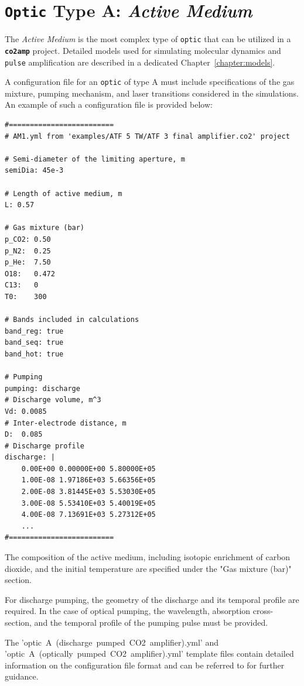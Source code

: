 \documentclass{report}
\begin{document}
\section{\texttt{Optic} Type A: \textit{Active Medium}}
The \textit{Active Medium} is the most complex type of \texttt{optic} that can be utilized in a \textbf{\texttt{co2amp}} project. Detailed models used for simulating molecular dynamics and \texttt{pulse} amplification are described in a dedicated Chapter~\ref{chapter:models}.

A configuration file for an \texttt{optic} of type A must include specifications of the gas mixture, pumping mechanism, and laser transitions considered in the simulations. An example of such a configuration file is provided below:

\begin{verbatim}
#=========================
# AM1.yml from 'examples/ATF 5 TW/ATF 3 final amplifier.co2' project

# Semi-diameter of the limiting aperture, m
semiDia: 45e-3

# Length of active medium, m
L: 0.57

# Gas mixture (bar)
p_CO2: 0.50
p_N2:  0.25
p_He:  7.50
O18:   0.472
C13:   0
T0:    300

# Bands included in calculations
band_reg: true
band_seq: true
band_hot: true

# Pumping
pumping: discharge
# Discharge volume, m^3
Vd: 0.0085
# Inter-electrode distance, m
D:  0.085
# Discharge profile
discharge: |
    0.00E+00 0.00000E+00 5.80000E+05
    1.00E-08 1.97186E+03 5.66356E+05
    2.00E-08 3.81445E+03 5.53030E+05
    3.00E-08 5.53410E+03 5.40019E+05
    4.00E-08 7.13691E+03 5.27312E+05
    ...
#=========================
\end{verbatim}

The composition of the active medium, including isotopic enrichment of carbon dioxide, and the initial temperature are specified under the "Gas mixture (bar)" section.

For discharge pumping, the geometry of the discharge and its temporal profile are required. In the case of optical pumping, the wavelength, absorption cross-section, and the temporal profile of the pumping pulse must be provided.

The 'optic~A~(discharge~pumped~CO2~amplifier).yml' and 'optic~A~(optically~pumped~CO2~amplifier).yml' template files contain detailed information on the configuration file format and can be referred to for further guidance.
\end{document}
